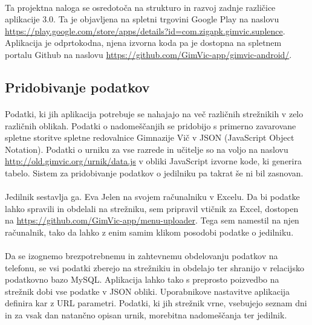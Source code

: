 \paragraph{}Ta projektna naloga se osredotoča na strukturo in razvoj zadnje različice aplikacije 3.0. Ta je objavljena na spletni trgovini Google Play na naslovu \url{https://play.google.com/store/apps/details?id=com.zigapk.gimvic.suplence}. Aplikacija je odprtokodna, njena izvorna koda pa je dostopna na spletnem portalu Github na naslovu \url{https://github.com/GimVic-app/gimvic-android/}.

\subsection{Pridobivanje podatkov}
\paragraph{}Podatki, ki jih aplikacija potrebuje se nahajajo na več različnih strežnikih v zelo različnih oblikah. Podatki o nadomeščanjih se pridobijo s primerno zavarovane spletne storitve spletne redovalnice Gimnazije Vič v JSON\cite{json-wiki} (JavaScript Object Notation). Podatki o urniku za vse razrede in učitelje so na voljo na naslovu \url{http://old.gimvic.org/urnik/data.js}\cite{rin} v obliki JavaScript izvorne kode, ki generira tabelo. Sistem za pridobivanje podatkov o jedilniku pa takrat še ni bil zasnovan.

\paragraph{}Jedilnik sestavlja ga. Eva Jelen na svojem računalniku v Excelu. Da bi podatke lahko spravili in obdelali na strežniku, sem pripravil vtičnik za Excel, dostopen na \url{https://github.com/GimVic-app/menu-uploader}. Tega sem namestil na njen računalnik, tako da lahko z enim samim klikom posodobi podatke o jedilniku.

\paragraph{}Da se izognemo brezpotrebnemu in zahtevnemu obdelovanju podatkov na telefonu, se vsi podatki zberejo na strežnikiu in obdelajo ter shranijo v relacijsko podatkovno bazo MySQL\cite{mysql-wiki}. Aplikacija lahko tako s preprosto poizvedbo na strežnik dobi vse podatke v JSON\cite{json-wiki} obliki. Uporabnikove nastavitve aplikacija definira kar z URL parametri\cite{query-wiki}. Podatki, ki jih strežnik vrne, vsebujejo seznam dni in za vsak dan natančno opisan urnik, morebitna nadomeščanja ter jedilnik.

